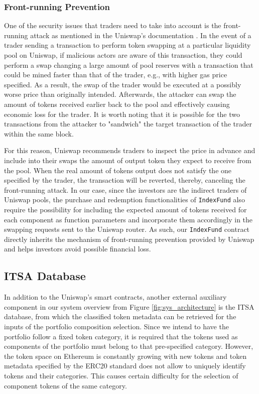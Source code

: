 \subsubsection{Front-running Prevention}

One of the security issues that traders need to take into account is the front-running attack as mentioned in the Uniswap's documentation \cite{uniswapPricing}. In the event of a trader sending a transaction to perform token swapping at a particular liquidity pool on Uniswap, if malicious actors are aware of this transaction, they could perform a swap changing a large amount of pool reserves with a transaction that could be mined faster than that of the trader, e.g., with higher gas price specified. As a result, the swap of the trader would be executed at a possibly worse price than originally intended. Afterwards, the attacker can swap the amount of tokens received earlier back to the pool and effectively causing economic loss for the trader. It is worth noting that it is possible for the two transactions from the attacker to "sandwich" the target transaction of the trader within the same block.

For this reason, Uniswap recommends traders to inspect the price in advance and include into their swaps the amount of output token they expect to receive from the pool. When the real amount of tokens output does not satisfy the one specified by the trader, the transaction will be reverted, thereby, canceling the front-running attack. In our case, since the investors are the indirect traders of Uniswap pools, the purchase and redemption functionalities of \texttt{IndexFund} also require the possibility for including the expected amount of tokens received for each component as function parameters and incorporate them accordingly in the swapping requests sent to the Uniswap router. As such, our \texttt{IndexFund} contract directly inherits the mechanism of front-running prevention provided by Uniswap and helps investors avoid possible financial loss.


\subsection{ITSA Database} \label{subsec:itsa}

In addition to the Uniswap's smart contracts, another external auxiliary component in our system overview from Figure \ref{fig:sys_architecture} is the ITSA database, from which the classified token metadata can be retrieved for the inputs of the portfolio composition selection. Since we intend to have the portfolio follow a fixed token category, it is required that the tokens used as components of the portfolio must belong to that pre-specified category. However, the token space on Ethereum is constantly growing with new tokens and token metadata specified by the ERC20 standard does not allow to uniquely identify tokens and their categories. This causes certain difficulty for the selection of component tokens of the same category. 

